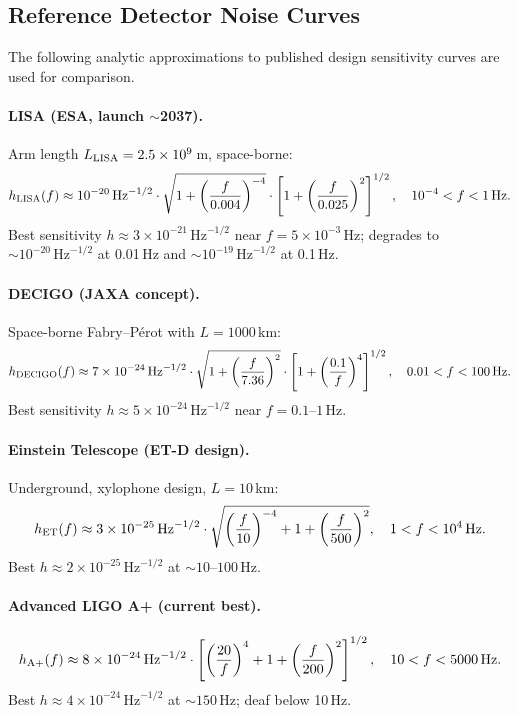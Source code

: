 \documentclass[11pt]{article}
\theoremstyle{definition}
\theoremstyle{remark}
\newcommand{\sqrtHz}{\,\mathrm{Hz}^{-1/2}}
\newcommand{\ee}[1]{\times10^{#1}}
\begin{document}
\subsection{Reference Detector Noise Curves}

The following analytic approximations to published design sensitivity curves
are used for comparison.

\paragraph{LISA (ESA, launch $\sim$2037).}
Arm length $L_{\rm LISA} = 2.5\ee{9}$\,m, space-borne:
\begin{equation}
h_{\rm LISA}(f) \approx 10^{-20}\sqrtHz \cdot
\sqrt{1 + \left(\frac{f}{0.004}\right)^{-4}} \cdot
\left[1 + \left(\frac{f}{0.025}\right)^2\right]^{1/2},
\quad 10^{-4} < f < 1\,\rm Hz.
\end{equation}
Best sensitivity $h \approx 3\ee{-21}\sqrtHz$ near $f = 5\ee{-3}$\,Hz;
degrades to $\sim 10^{-20}\sqrtHz$ at 0.01\,Hz and $\sim 10^{-19}\sqrtHz$
at 0.1\,Hz.

\paragraph{DECIGO (JAXA concept).}
Space-borne Fabry--P\'{e}rot with $L = 1000$\,km:
\begin{equation}
h_{\rm DECIGO}(f) \approx 7\ee{-24}\sqrtHz \cdot
\sqrt{1 + \left(\frac{f}{7.36}\right)^{2}} \cdot
\left[1 + \left(\frac{0.1}{f}\right)^{4}\right]^{1/2},
\quad 0.01 < f < 100\,\rm Hz.
\end{equation}
Best sensitivity $h \approx 5\ee{-24}\sqrtHz$ near $f = 0.1$--$1$\,Hz.

\paragraph{Einstein Telescope (ET-D design).}
Underground, xylophone design, $L = 10$\,km:
\begin{equation}
h_{\rm ET}(f) \approx 3\ee{-25}\sqrtHz \cdot
\sqrt{\left(\frac{f}{10}\right)^{-4} + 1 + \left(\frac{f}{500}\right)^{2}},
\quad 1 < f < 10^4\,\rm Hz.
\end{equation}
Best $h \approx 2\ee{-25}\sqrtHz$ at $\sim 10$--$100$\,Hz.

\paragraph{Advanced LIGO A+ (current best).}
\begin{equation}
h_{\rm A+}(f) \approx 8\ee{-24}\sqrtHz \cdot
\left[\left(\frac{20}{f}\right)^{4} + 1 + \left(\frac{f}{200}\right)^{2}\right]^{1/2},
\quad 10 < f < 5000\,\rm Hz.
\end{equation}
Best $h \approx 4\ee{-24}\sqrtHz$ at $\sim 150$\,Hz; deaf below 10\,Hz.
\end{document}
